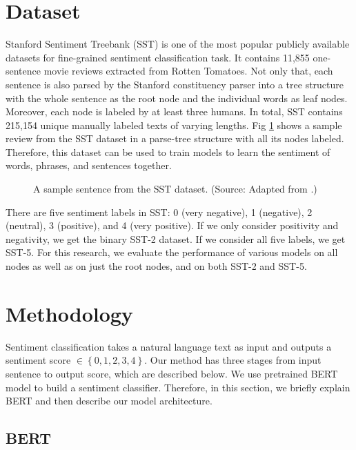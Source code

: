 \documentclass[conference]{IEEEtran}
\begin{document}
 \section{Dataset}\label{sec:data}

Stanford Sentiment Treebank (SST)\cite{rntn} is one of the most popular publicly available datasets for fine-grained sentiment classification task. It contains 11,855 one-sentence movie reviews extracted from Rotten Tomatoes. Not only that, each sentence is also parsed by the Stanford constituency parser\cite{stanford-parser} into a tree structure with the whole sentence as the root node and the individual words as leaf nodes. Moreover, each node is labeled by at least three humans. In total, SST contains 215,154 unique manually labeled texts of varying lengths. Fig \ref{fig:sst-sample} shows a sample review from the SST dataset in a parse-tree structure with all its nodes labeled. Therefore, this dataset can be used to train models to learn the sentiment of words, phrases, and sentences together.

\begin{figure}[ht]
    \centering
    \caption{A sample sentence from the SST dataset. (Source: Adapted from  \cite{rntn}.)}
    \label{fig:sst-sample}
\end{figure}

There are five sentiment labels in SST: 0 (very negative), 1 (negative), 2 (neutral), 3 (positive), and 4 (very positive). If we only consider positivity and negativity, we get the binary SST-2 dataset. If we consider all five labels, we get SST-5. For this research, we evaluate the performance of various models on all nodes as well as on just the root nodes, and on both SST-2 and SST-5. \section{Methodology}\label{sec:method}

Sentiment classification takes a natural language text as input and outputs a sentiment score $\in \left\{0,1,2,3,4\right\}$. Our method has three stages from input sentence to output score, which are described below. We use pretrained BERT model to build a sentiment classifier. Therefore, in this section, we briefly explain BERT and then describe our model architecture.

\subsection{BERT}
\end{document}
